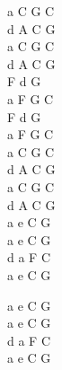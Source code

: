 \documentclass[a5paper, 10pt]{book}
\begin{document}
\begin{minipage}[t]{0.3\textwidth}
a C G C\\
d A C G\\
a C G C\\
d A C G\\

F d G \\
a F G C\\
F d G \\
a F G C\\

a C G C\\
d A C G\\
a C G C\\
d A C G\\


a e C G\\
a e C G\\
d a F C\\
a e C G\vspace*{2mm}

a e C G\\
a e C G\\
d a F C\\
a e C G\\
\end{minipage}

\newpage
\end{document}
